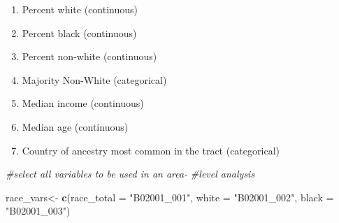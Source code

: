 \documentclass[
]{article}
\newenvironment{Shaded}{\begin{snugshade}}{\end{snugshade}}
\newcommand{\CommentTok}[1]{\textcolor[rgb]{0.56,0.35,0.01}{\textit{#1}}}
\newcommand{\DataTypeTok}[1]{\textcolor[rgb]{0.13,0.29,0.53}{#1}}
\newcommand{\KeywordTok}[1]{\textcolor[rgb]{0.13,0.29,0.53}{\textbf{#1}}}
\newcommand{\NormalTok}[1]{#1}
\newcommand{\StringTok}[1]{\textcolor[rgb]{0.31,0.60,0.02}{#1}}
\providecommand{\tightlist}{%
  \setlength{\itemsep}{0pt}\setlength{\parskip}{0pt}}
\begin{document}
\begin{enumerate}
\def\labelenumi{\arabic{enumi}.}
\tightlist
\item
  Percent white (continuous)
\item
  Percent black (continuous)
\item
  Percent non-white (continuous)
\item
  Majority Non-White (categorical)
\item
  Median income (continuous)
\item
  Median age (continuous)
\item
  Country of ancestry most common in the tract (categorical)
\end{enumerate}

\begin{Shaded}
\begin{Highlighting}[]
\CommentTok{#select all variables to be used in an area-}
\CommentTok{#level analysis}

\NormalTok{race_vars<-}\StringTok{ }\KeywordTok{c}\NormalTok{(}\DataTypeTok{race_total =} \StringTok{"B02001_001"}\NormalTok{,}
              \DataTypeTok{white =} \StringTok{"B02001_002"}\NormalTok{,}
              \DataTypeTok{black =} \StringTok{"B02001_003"}\NormalTok{)}


\end{Highlighting}
\end{Shaded}
\end{document}
